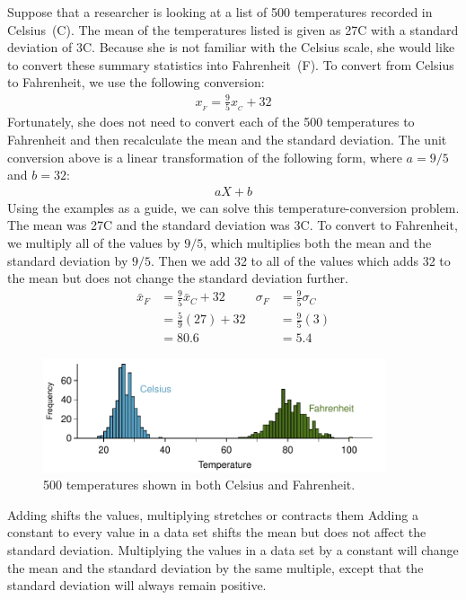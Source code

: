 Suppose that a researcher is looking at a list of 500 temperatures recorded in Celsius~(C). The mean of the temperatures listed is given as 27\degree C with a standard deviation of 3\degree C. Because she is not familiar with the Celsius scale, she would like to convert these summary statistics into Fahrenheit~(F). To convert from Celsius to Fahrenheit, we use the following conversion:
\begin{align*}
x_{_F} = \frac{9}{5}x_{_C} + 32
\end{align*}
Fortunately, she does not need to convert each of the 500 temperatures to Fahrenheit and then recalculate the mean and the standard deviation. The unit conversion above is a linear transformation of the following form, where $a=9/5$ and $b=32$:
\begin{align*}
aX + b
\end{align*}
Using the examples as a guide, we can solve this temperature-conversion problem. The mean was 27\degree C and the standard deviation was 3\degree C. To convert to Fahrenheit, we multiply all of the values by $9/5$, which multiplies both the mean and the standard deviation by $9/5$. Then we add 32 to all of the values which adds 32 to the mean but does not change the standard deviation further.
\begin{align*}
\bar{x}_{F} &= \frac{9}{5}\bar{x}_{C} + 32 & \sigma_{F} &= \frac{9}{5}\sigma_{C} \\
&= \frac{5}{9}(27)+ 32 & &=\frac{9}{5}(3) \\
&=80.6 &  &=5.4
\end{align*}

\begin{figure}[h]
   \centering
   \includegraphics[width=0.9\textwidth]{ch_summarizing_data/figures/CToF_ConversionFigure/CToF_ConversionFigure}
   \caption{500 temperatures shown in both Celsius and \mbox{Fahrenheit.}}
   \label{CToF_ConversionFigure}
\end{figure}


\begin{onebox}{Adding shifts the values, multiplying stretches or contracts them}
Adding a constant to every value in a data set shifts the mean but does not affect the standard deviation. Multiplying the values in a data set by a constant will change the mean and the standard deviation by the same multiple, except that the standard deviation will always remain positive.\end{onebox}

